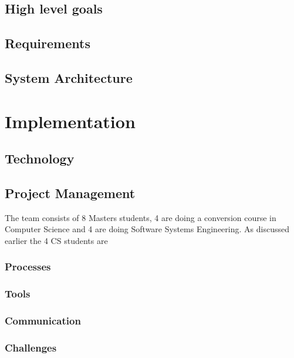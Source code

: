 \documentclass[prodmode,acmtecs]{acmsmall} %
\begin{document}
\subsection{High level goals}


\subsection{Requirements}

\subsection{System Architecture}

\section{Implementation}


\subsection{Technology}

\subsection{Project Management}
The team consists of 8 Masters students, 4 are doing a conversion course in Computer Science and 4 are doing Software Systems Engineering. As discussed earlier the 4 CS students are 
\subsubsection{Processes}


\subsubsection{Tools}

\subsubsection{Communication}

\subsubsection{Challenges}
\end{document}
